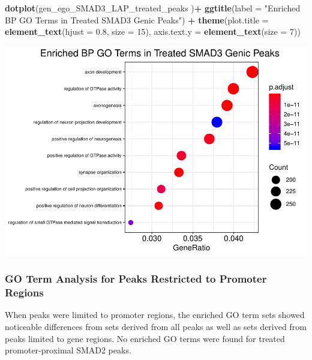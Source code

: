 \documentclass[]{article}
\newenvironment{Shaded}{\begin{snugshade}}{\end{snugshade}}
\newcommand{\DataTypeTok}[1]{\textcolor[rgb]{0.13,0.29,0.53}{#1}}
\newcommand{\DecValTok}[1]{\textcolor[rgb]{0.00,0.00,0.81}{#1}}
\newcommand{\FloatTok}[1]{\textcolor[rgb]{0.00,0.00,0.81}{#1}}
\newcommand{\KeywordTok}[1]{\textcolor[rgb]{0.13,0.29,0.53}{\textbf{#1}}}
\newcommand{\NormalTok}[1]{#1}
\newcommand{\OperatorTok}[1]{\textcolor[rgb]{0.81,0.36,0.00}{\textbf{#1}}}
\newcommand{\StringTok}[1]{\textcolor[rgb]{0.31,0.60,0.02}{#1}}
\begin{document}
\clearpage{}

\begin{Shaded}
\begin{Highlighting}[]
\KeywordTok{dotplot}\NormalTok{(gen_ego_SMAD3_LAP_treated_peaks )}\OperatorTok{+}\StringTok{ }\KeywordTok{ggtitle}\NormalTok{(}\DataTypeTok{label =} \StringTok{"Enriched BP GO Terms in Treated SMAD3 Genic Peaks"}\NormalTok{) }\OperatorTok{+}\StringTok{ }\KeywordTok{theme}\NormalTok{(}\DataTypeTok{plot.title =} \KeywordTok{element_text}\NormalTok{(}\DataTypeTok{hjust =} \FloatTok{0.8}\NormalTok{, }\DataTypeTok{size =} \DecValTok{15}\NormalTok{), }\DataTypeTok{axis.text.y =} \KeywordTok{element_text}\NormalTok{(}\DataTypeTok{size =} \DecValTok{7}\NormalTok{))}
\end{Highlighting}
\end{Shaded}

\includegraphics{peak_annotation_go_term_analysis_files/figure-latex/unnamed-chunk-25-1.pdf}

\clearpage{}


\subsubsection{GO Term Analysis for Peaks Restricted to Promoter Regions}

When peaks were limited to promoter regions, the enriched GO term sets
showed noticeable differences from sets derived from all peaks as well
as sets derived from peaks limited to gene regions. No enriched GO terms
were found for treated promoter-proximal SMAD2 peaks.
\end{document}
